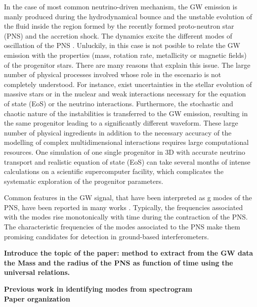 In the case of most common neutrino-driven mechanism, the GW emission is manly produced during the hydrodynamical bounce and the unstable evolution of the fluid inside the region formed by the recently formed proto-neutron star (PNS) and the accretion shock. The dynamics excite the different modes of oscillation of the PNS \cite{kokkotas, Friedman:2013}. Unluckily, in this case is not posible to relate the GW emission with the properties (mass, rotation rate, metallicity or magnetic fields) of the progenitor stars. There are many reasons that explain this issue. The large number of physical processes involved whose role in the escenario is not completely understood. For instance, exist uncertainties in the stellar evolution of massive stars or in the nuclear and weak interactions necessary for the equation of state (EoS) or the neutrino interactions. Furthermore, the stochastic and chaotic nature of the instabilities is transferred to the GW emission, resulting in the same progenitor leading to a significantly different waveform.
These large number of physical ingredients in addition to the necessary accuracy of the modelling of complex multidimensional interactions requires large computational resources. One simulation of one single progenitor in 3D with accurate neutrino transport and realistic equation of state (EoS) can take several months of intense calculations on a scientific supercomputer facility, which complicates the systematic exploration of the progenitor parameters.

Common features in the GW signal, that have been interpreted as g modes of the PNS, have been reported in many works \cite{murphy:09, Cerda:2013, mueller:13gw, Yakunin:2015, Kuroda:2016, Andresen:2017}.  Typically, the frequencies associated with the modes rise monotonically with time during the contraction of the PNS. The characteristic frequencies of the modes associated to the PNS make them promising candidates for detection in ground-based interferometers.  


\textbf{Introduce the topic of the paper: method to extract from the GW data the Mass and the radius of the PNS as function of time using the universal relations.}

\textbf{Previous work in identifying modes from spectrogram}\\
\textbf{Paper organization}\\

